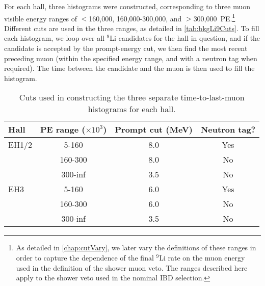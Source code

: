 \documentclass[../thesis.tex]{subfiles}
\begin{document}
For each hall, three histograms were constructed, corresponding to three muon visible energy ranges of $<$160,000, 160,000-300,000, and $>$300,000~PE.\footnote{As detailed in \autoref{chap:cutVary}, we later vary the definitions of these ranges in order to capture the dependence of the final $^9$Li rate on the muon energy used in the definition of the shower muon veto. The ranges described here apply to the shower veto used in the nominal IBD selection.} Different cuts are used in the three ranges, as detailed in \autoref{tab:bkgLi9Cuts}. To fill each histogram, we loop over all $^9$Li candidates for the hall in question, and if the candidate is accepted by the prompt-energy cut, we then find the most recent preceding muon (within the specified energy range, and with a neutron tag when required). The time between the candidate and the muon is then used to fill the histogram.

\begin{table}[h]
  \centering
  \begin{tabular}{lccc}
    \toprule
    Hall & PE range ($\times10^3$) & Prompt cut (MeV) & Neutron tag? \\
    \midrule
    EH1/2  & 5-160   & 8.0 & Yes \\
           & 160-300 & 8.0 & No  \\
           & 300-inf & 3.5 & No  \\
    \midrule
    EH3  & 5-160   & 6.0 & Yes \\
         & 160-300 & 6.0 & No  \\
         & 300-inf & 3.5 & No  \\
    \bottomrule
  \end{tabular}
  \caption{Cuts used in constructing the three separate time-to-last-muon histograms for each hall.}
  \label{tab:bkgLi9Cuts}
\end{table}
\end{document}
